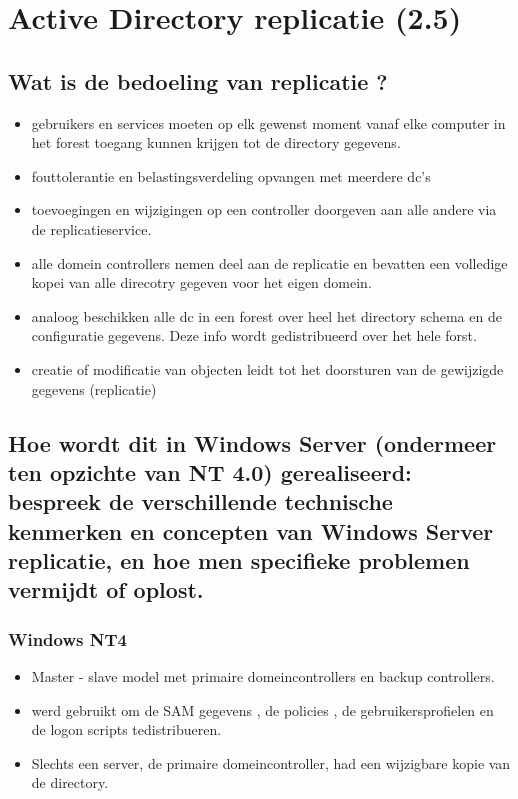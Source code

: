 \chapter{Active Directory replicatie (2.5)}
\section{Wat is de bedoeling van replicatie ?}
\begin{itemize}
\item gebruikers en services moeten op elk gewenst moment vanaf elke computer in het forest toegang kunnen krijgen tot de directory gegevens. 
\item fouttolerantie en belastingsverdeling opvangen met meerdere dc's
\item toevoegingen en wijzigingen op een controller doorgeven aan alle andere via de replicatieservice.
\item alle domein controllers nemen deel aan de replicatie en bevatten een volledige kopei van alle direcotry gegeven voor het eigen domein.
\item analoog beschikken alle dc in een forest over heel het directory schema en de configuratie gegevens. Deze info wordt gedistribueerd over het hele forst.
\item creatie of modificatie van objecten leidt tot het doorsturen van de gewijzigde gegevens (replicatie)
\end{itemize}
\clearpage
\section{Hoe wordt dit in Windows Server (ondermeer ten opzichte van NT 4.0) gerealiseerd: bespreek de verschillende technische kenmerken en concepten van Windows Server replicatie, en hoe men specifieke problemen vermijdt of oplost.}

\subsection{Windows NT4}
\begin{itemize}
\item Master - slave model met primaire domeincontrollers en backup controllers.
\item werd gebruikt om de SAM gegevens , de policies , de gebruikersprofielen en de logon scripts tedistribueren.
\item Slechts een server, de primaire domeincontroller, had een wijzigbare kopie van de directory.
\end{itemize}

